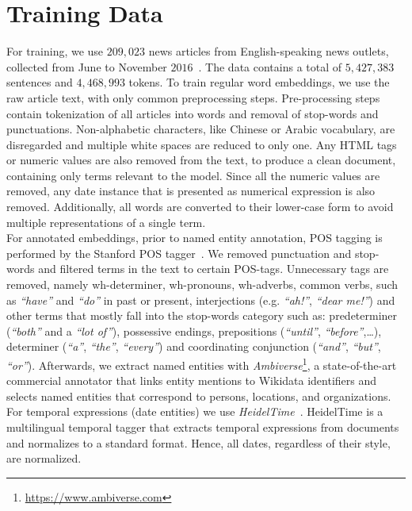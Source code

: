 \section{Training Data}\label{sec:data}
For training, we use $209,023$ news articles from English-speaking news outlets, collected from June to November $2016$~. The data contains a total of $5,427,383$ sentences and $4,468,993$ tokens. To train regular word embeddings, we use the raw article text, with only common preprocessing steps. Pre-processing steps contain tokenization of all articles into words and removal of stop-words and punctuations. Non-alphabetic characters, like Chinese or Arabic vocabulary, are disregarded and multiple white spaces are reduced to only one. Any HTML tags or numeric values are also removed from the text, to produce a clean document, containing only terms relevant to the model. Since all the numeric values are removed, any date instance that is presented as numerical expression is also removed. Additionally, all words are converted to their lower-case form to avoid multiple representations of a single term.\\
For annotated embeddings, prior to named entity annotation, POS tagging is performed by the Stanford POS tagger~. 
We removed punctuation and stop-words and filtered terms in the text to  certain POS-tags. Unnecessary tags are removed, namely  wh-determiner, wh-pronouns, wh-adverbs, common verbs, such as \emph{``have''} and \emph{``do''} in past or present, interjections (e.g. \emph{``ah!''}, \emph{``dear me!''}) and other terms that mostly fall into the stop-words category such as: predeterminer (\emph{``both''} and a \emph{``lot of''}), possessive endings, prepositions (\emph{``until''}, \emph{``before''},\dots), determiner (\emph{``a''}, \emph{``the''}, \emph{``every''}) and coordinating conjunction (\emph{``and''}, \emph{``but''}, \emph{``or''}). Afterwards, we extract named entities with \emph{Ambiverse}\footnote{\url{https://www.ambiverse.com}}, a state-of-the-art commercial annotator that links entity mentions to Wikidata identifiers and selects named entities that correspond to persons, locations, and organizations. For temporal expressions (date entities) we use \emph{HeidelTime}~. HeidelTime is a multilingual temporal tagger that extracts temporal expressions from documents and normalizes to a standard format. Hence, all dates, regardless of their style, are normalized.\\
